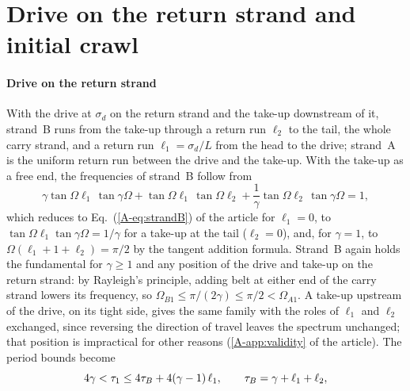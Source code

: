 \section{Drive on the return strand and initial crawl}\label{supp:intermediate}

\paragraph{Drive on the return strand} With the drive at $\sigma_d$ on the return strand and the
take-up downstream of it, strand~B runs from the take-up through a return run $\ell_2$ to the
tail, the whole carry strand, and a return run $\ell_1=\sigma_d/L$ from the head to the drive;
strand~A is the uniform return run between the drive and the take-up. With the take-up as a free
end, the frequencies of strand~B follow from
\begin{equation}\label{eq:strandB3}
  \gamma\tan\Omega\ell_1\,\tan\gamma\Omega+\tan\Omega\ell_1\,\tan\Omega\ell_2
  +\frac{1}{\gamma}\tan\Omega\ell_2\,\tan\gamma\Omega=1,
\end{equation}
which reduces to Eq.~(\ref{A-eq:strandB}) of the article for $\ell_1=0$, to
$\tan\Omega\ell_1\tan\gamma\Omega=1/\gamma$ for a take-up at the tail ($\ell_2=0$), and, for
$\gamma=1$, to $\Omega(\ell_1+1+\ell_2)=\pi/2$ by the tangent addition formula. Strand~B again
holds the fundamental for $\gamma\ge1$ and any position of the drive and take-up on the return
strand: by Rayleigh's principle, adding belt at either end of the carry strand lowers its
frequency, so $\Omega_{B1}\le\pi/(2\gamma)\le\pi/2<\Omega_{A1}$. A take-up upstream of the
drive, on its tight side, gives the same family with the roles of $\ell_1$ and $\ell_2$
exchanged, since reversing the direction of travel leaves the spectrum unchanged; that position
is impractical for other reasons (\ref{A-app:validity} of the article). The period
bounds become
\begin{equation}\label{eq:bounds_intermediate}
  4\gamma<\tau_{1}\le4\tau_B+4(\gamma-1)\,\ell_1,\qquad \tau_B=\gamma+\ell_1+\ell_2,
\end{equation}

